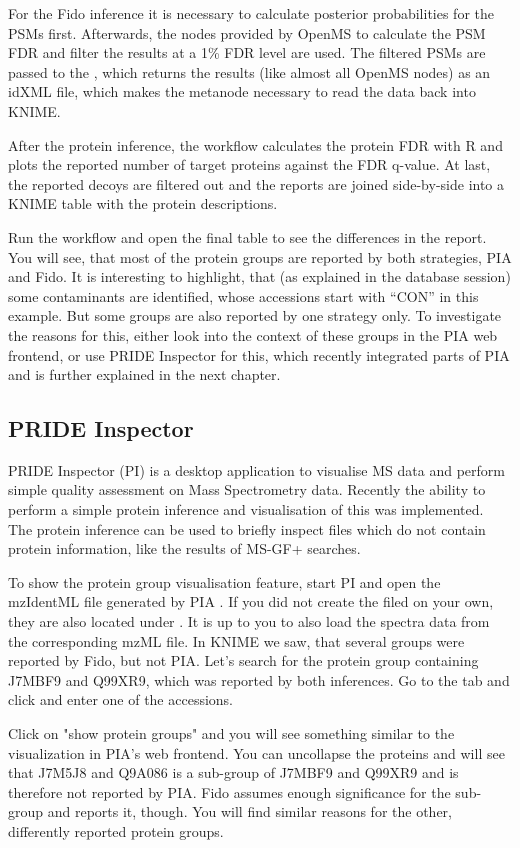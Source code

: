 For the Fido inference it is necessary to calculate posterior probabilities for the PSMs first. Afterwards, the nodes provided by OpenMS to calculate the PSM FDR and filter the results at a 1\% FDR level are used. The filtered PSMs are passed to the , which returns the results (like almost all OpenMS nodes) as an idXML file, which makes the metanode necessary to read the data back into KNIME.

After the protein inference, the workflow calculates the protein FDR with R and plots the reported number of target proteins against the FDR q-value. At last, the reported decoys are filtered out and the reports are joined side-by-side into a KNIME table with the protein descriptions.

\begin{task}
    Run the workflow and open the final table to see the differences in the report. You will see, that most of the protein groups are reported by both strategies, PIA and Fido. It is interesting to highlight, that (as explained in the database session) some contaminants are identified, whose accessions start with “CON” in this example. But some groups are also reported by one strategy only. To investigate the reasons for this, either look into the context of these groups in the PIA web frontend, or use PRIDE Inspector for this, which recently integrated parts of PIA and is further explained in the next chapter.
\end{task}


\subsection{PRIDE Inspector}
PRIDE Inspector (PI) is a desktop application to visualise MS data and perform simple quality assessment on Mass Spectrometry data. Recently the ability to perform a simple protein inference and visualisation of this was implemented. The protein inference can be used to briefly inspect files which do not contain protein information, like the results of MS-GF+ searches.

\begin{task}
    To show the protein group visualisation feature, start PI and open the mzIdentML file generated by PIA . If you did not create the filed on your own, they are also located under . It is up to you to also load the spectra data from the corresponding mzML file. In KNIME we saw, that several groups were reported by Fido, but not PIA. Let’s search for the protein group containing J7MBF9 and Q99XR9, which was reported by both inferences. Go to the  tab and click  and enter one of the accessions.
    
    Click on "show protein groups" and you will see something similar to the visualization in PIA’s web frontend. You can uncollapse the proteins and will see that J7M5J8 and Q9A086 is a sub-group of J7MBF9 and Q99XR9 and is therefore not reported by PIA. Fido assumes enough significance for the sub-group and reports it, though. You will find similar reasons for the other, differently reported protein groups.
\end{task}

